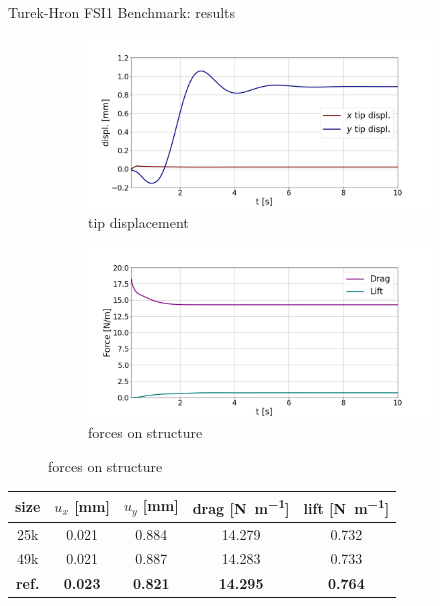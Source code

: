 \documentclass[10pt,t]{beamer}
\begin{document}
\begin{frame}{Turek-Hron FSI1 Benchmark: results}


\begin{figure}[htb]
\centering %
\begin{subfigure}{0.5\textwidth}
  \includegraphics[width=\linewidth, trim=0 0 0 0, clip]{images/FSI1/fsi1_displ_pres.png}
  \caption{tip displacement}
\end{subfigure}\hfil %
\begin{subfigure}{0.5\textwidth}
  \includegraphics[width=\linewidth, trim=0 0 0 0, clip]{images/FSI1/fsi1_forces_pres.png}
  \caption{forces on structure}
\end{subfigure}\hfil %
    
\end{figure}



\footnotesize
\begin{table}[h!]
\label{tab:fsi1}
\begin{center}
\begin{tabular}{ c | c c | c c  }
size & $u_x$ [\si{mm}] & $u_y$ [\si{mm}]  & drag [\si{N.m^{-1}}] & lift [\si{N.m^{-1}}] \\
\hline
25k    & 0.021 & 0.884 & 14.279 & 0.732   \\
\hline
49k    & 0.021   & 0.887 & 14.283 & 0.733 \\
\hline
\hline
\textbf{ref.}  &  \textbf{0.023} & \textbf{0.821} & \textbf{14.295} & \textbf{0.764}  \\
\hline
\end{tabular}
\end{center}
\end{table}



\end{frame}
\end{document}
